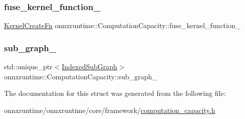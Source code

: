 \subsubsection{\texorpdfstring{fuse\+\_\+kernel\+\_\+function\+\_\+}{fuse\_kernel\_function\_}}
{\footnotesize\ttfamily \mbox{\hyperlink{namespaceonnxruntime_a2e23731e78afbe4e5e15a18493162335}{Kernel\+Create\+Fn}} onnxruntime\+::\+Computation\+Capacity\+::fuse\+\_\+kernel\+\_\+function\+\_\+}

\mbox{\label{structonnxruntime_1_1ComputationCapacity_ad036d087d74f02901257c77b9fb72652}} 
\subsubsection{\texorpdfstring{sub\+\_\+graph\+\_\+}{sub\_graph\_}}
{\footnotesize\ttfamily std\+::unique\+\_\+ptr$<$\mbox{\hyperlink{structonnxruntime_1_1IndexedSubGraph}{Indexed\+Sub\+Graph}}$>$ onnxruntime\+::\+Computation\+Capacity\+::sub\+\_\+graph\+\_\+}



The documentation for this struct was generated from the following file\+:\begin{DoxyCompactItemize}
\item 
onnxruntime/onnxruntime/core/framework/\mbox{\hyperlink{computation__capacity_8h}{computation\+\_\+capacity.\+h}}\end{DoxyCompactItemize}
